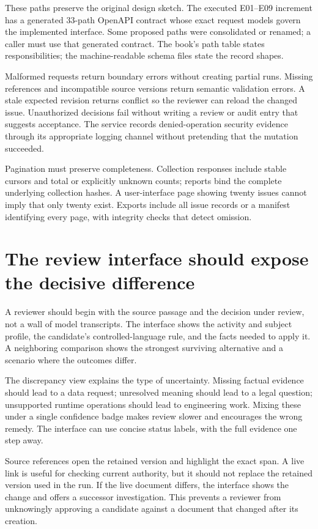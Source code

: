 \documentclass[12pt,a4paper,oneside,openany]{book}
\begin{document}
These paths preserve the original design sketch. The executed E01--E09
increment has a generated 33-path OpenAPI contract whose exact request
models govern the implemented interface. Some proposed paths were
consolidated or renamed; a caller must use that generated contract. The book's
path table states responsibilities; the machine-readable schema files state the
record shapes.

Malformed requests return boundary errors without creating partial runs. Missing
references and incompatible source versions return semantic validation errors.
A stale expected revision returns conflict so the reviewer can reload the changed
issue. Unauthorized decisions fail without writing a review or audit entry that
suggests acceptance. The service records denied-operation security evidence
through its appropriate logging channel without pretending that the mutation
succeeded.

Pagination must preserve completeness. Collection responses include stable cursors
and total or explicitly unknown counts; reports bind the complete underlying
collection hashes. A user-interface page showing twenty issues cannot imply that
only twenty exist. Exports include all issue records or a manifest identifying
every page, with integrity checks that detect omission.

\section{The review interface should expose the decisive difference}
\label{merge:M08:08}


A reviewer should begin with the source passage and the decision under review,
not a wall of model transcripts. The interface shows the activity and subject
profile, the candidate's controlled-language rule, and the facts needed to apply
it. A neighboring comparison shows the strongest surviving alternative and a
scenario where the outcomes differ.

The discrepancy view explains the type of uncertainty. Missing factual evidence
should lead to a data request; unresolved meaning should lead to a legal question;
unsupported runtime operations should lead to engineering work. Mixing these
under a single confidence badge makes review slower and encourages the wrong
remedy. The interface can use concise status labels, with the full evidence one
step away.

Source references open the retained version and highlight the exact span. A live
link is useful for checking current authority, but it should not replace the
retained version used in the run. If the live document differs, the interface
shows the change and offers a successor investigation. This prevents a reviewer
from unknowingly approving a candidate against a document that changed after
its creation.
\end{document}
